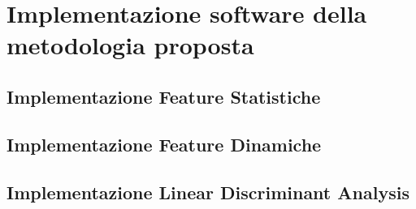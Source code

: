 
\chapter[Implementazione Software]{Implementazione software della metodologia proposta}\label{chap6:SW}
\section{Implementazione Feature Statistiche}


\section{Implementazione Feature Dinamiche}


\section{Implementazione Linear Discriminant Analysis}